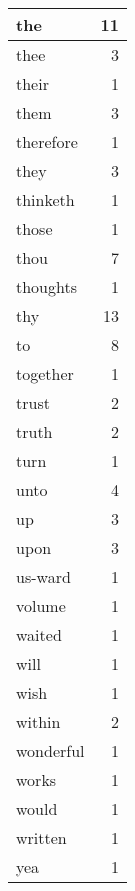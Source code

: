 \begin{center}
\begin{longtable}{l|r}
the & 11 \\ \hline
thee & 3 \\ \hline
their & 1 \\ \hline
them & 3 \\ \hline
therefore & 1 \\ \hline
they & 3 \\ \hline
thinketh & 1 \\ \hline
those & 1 \\ \hline
thou & 7 \\ \hline
thoughts & 1 \\ \hline
thy & 13 \\ \hline
to & 8 \\ \hline
together & 1 \\ \hline
trust & 2 \\ \hline
truth & 2 \\ \hline
turn & 1 \\ \hline
unto & 4 \\ \hline
up & 3 \\ \hline
upon & 3 \\ \hline
us-ward & 1 \\ \hline
volume & 1 \\ \hline
waited & 1 \\ \hline
will & 1 \\ \hline
wish & 1 \\ \hline
within & 2 \\ \hline
wonderful & 1 \\ \hline
works & 1 \\ \hline
would & 1 \\ \hline
written & 1 \\ \hline
yea & 1 \\ \hline
\end{longtable}
\end{center}



\normalsize



